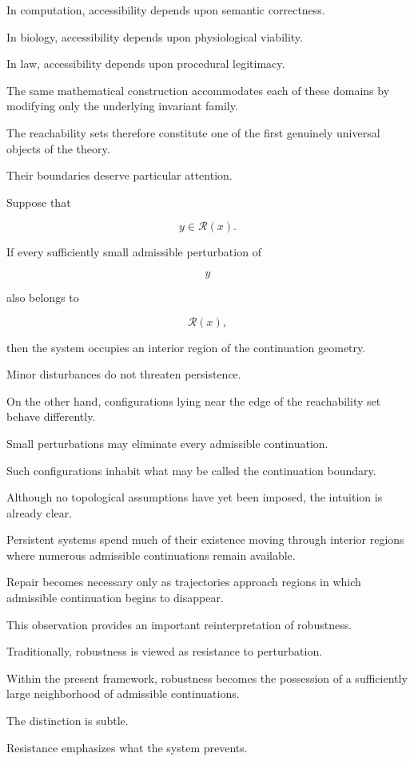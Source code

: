 \documentclass[11pt]{book}
\numberwithin{equation}{chapter}
\theoremstyle{definition}
\theoremstyle{plain}
\begin{document}
In computation, accessibility depends upon semantic correctness.

In biology, accessibility depends upon physiological viability.

In law, accessibility depends upon procedural legitimacy.

The same mathematical construction accommodates each of these domains by modifying only the underlying invariant family.

The reachability sets therefore constitute one of the first genuinely universal objects of the theory.

Their boundaries deserve particular attention.

Suppose that

\[
y\in\mathcal{R}(x).
\]

If every sufficiently small admissible perturbation of

\[
y
\]

also belongs to

\[
\mathcal{R}(x),
\]

then the system occupies an interior region of the continuation geometry.

Minor disturbances do not threaten persistence.

On the other hand, configurations lying near the edge of the reachability set behave differently.

Small perturbations may eliminate every admissible continuation.

Such configurations inhabit what may be called the continuation boundary.

Although no topological assumptions have yet been imposed, the intuition is already clear.

Persistent systems spend much of their existence moving through interior regions where numerous admissible continuations remain available.

Repair becomes necessary only as trajectories approach regions in which admissible continuation begins to disappear.

This observation provides an important reinterpretation of robustness.

Traditionally, robustness is viewed as resistance to perturbation.

Within the present framework, robustness becomes the possession of a sufficiently large neighborhood of admissible continuations.

The distinction is subtle.

Resistance emphasizes what the system prevents.
\end{document}
